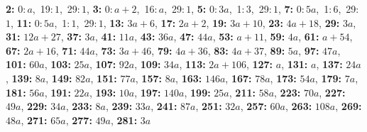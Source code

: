 \textsf{\bfseries 2:} 0:\,$a$,\ 19:\,$1$,\ 29:\,$1$, \textsf{\bfseries 3:} 0:\,$a + 2$,\ 16:\,$a$,\ 29:\,$1$, \textsf{\bfseries 5:} 0:\,$3a$,\ 1:\,$3$,\ 29:\,$1$, \textsf{\bfseries 7:} 0:\,$5a$,\ 1:\,$6$,\ 29:\,$1$, \textsf{\bfseries 11:} 0:\,$5a$,\ 1:\,$1$,\ 29:\,$1$, \textsf{\bfseries 13:} $3a + 6$, \textsf{\bfseries 17:} $2a + 2$, \textsf{\bfseries 19:} $3a + 10$, \textsf{\bfseries 23:} $4a + 18$, \textsf{\bfseries 29:} $3a$, \textsf{\bfseries 31:} $12a + 27$, \textsf{\bfseries 37:} $3a$, \textsf{\bfseries 41:} $11a$, \textsf{\bfseries 43:} $36a$, \textsf{\bfseries 47:} $44a$, \textsf{\bfseries 53:} $a + 11$, \textsf{\bfseries 59:} $4a$, \textsf{\bfseries 61:} $a + 54$, \textsf{\bfseries 67:} $2a + 16$, \textsf{\bfseries 71:} $44a$, \textsf{\bfseries 73:} $3a + 46$, \textsf{\bfseries 79:} $4a + 36$, \textsf{\bfseries 83:} $4a + 37$, \textsf{\bfseries 89:} $5a$, \textsf{\bfseries 97:} $47a$, \textsf{\bfseries 101:} $60a$, \textsf{\bfseries 103:} $25a$, \textsf{\bfseries 107:} $92a$, \textsf{\bfseries 109:} $34a$, \textsf{\bfseries 113:} $2a + 106$, \textsf{\bfseries 127:} $a$, \textsf{\bfseries 131:} $a$, \textsf{\bfseries 137:} $24a$, \textsf{\bfseries 139:} $8a$, \textsf{\bfseries 149:} $82a$, \textsf{\bfseries 151:} $77a$, \textsf{\bfseries 157:} $8a$, \textsf{\bfseries 163:} $146a$, \textsf{\bfseries 167:} $78a$, \textsf{\bfseries 173:} $54a$, \textsf{\bfseries 179:} $7a$, \textsf{\bfseries 181:} $56a$, \textsf{\bfseries 191:} $22a$, \textsf{\bfseries 193:} $10a$, \textsf{\bfseries 197:} $140a$, \textsf{\bfseries 199:} $25a$, \textsf{\bfseries 211:} $58a$, \textsf{\bfseries 223:} $70a$, \textsf{\bfseries 227:} $49a$, \textsf{\bfseries 229:} $34a$, \textsf{\bfseries 233:} $8a$, \textsf{\bfseries 239:} $33a$, \textsf{\bfseries 241:} $87a$, \textsf{\bfseries 251:} $32a$, \textsf{\bfseries 257:} $60a$, \textsf{\bfseries 263:} $108a$, \textsf{\bfseries 269:} $48a$, \textsf{\bfseries 271:} $65a$, \textsf{\bfseries 277:} $49a$, \textsf{\bfseries 281:} $3a$